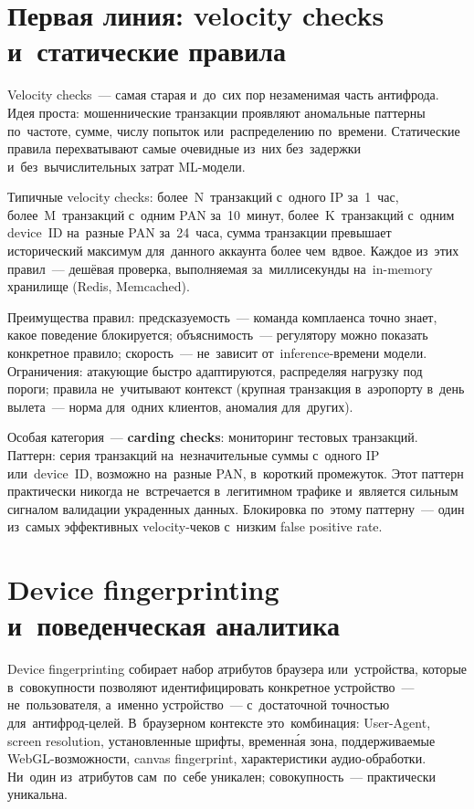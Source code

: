 \section{Первая линия: velocity checks и~статические правила}
\label{sec:fraud-rules}

Velocity checks~--- самая старая и~до~сих пор незаменимая часть
антифрода. Идея проста: мошеннические транзакции проявляют аномальные
паттерны по~частоте, сумме, числу попыток или~распределению по~времени.
Статические правила перехватывают самые очевидные из~них без~задержки
и~без~вычислительных затрат ML-модели.

Типичные velocity checks: более~N~транзакций с~одного IP за~1~час,
более~M~транзакций с~одним PAN за~10~минут, более~K~транзакций
с~одним device~ID на~разные PAN за~24~часа, сумма транзакции превышает
исторический максимум для~данного аккаунта более чем~вдвое. Каждое
из~этих правил~--- дешёвая проверка, выполняемая за~миллисекунды
на~in-memory хранилище (Redis, Memcached).

Преимущества правил: предсказуемость~--- команда комплаенса точно знает,
какое поведение блокируется; объяснимость~--- регулятору можно показать
конкретное правило; скорость~--- не~зависит от~inference-времени модели.
Ограничения: атакующие быстро адаптируются, распределяя нагрузку под
пороги; правила не~учитывают контекст (крупная транзакция в~аэропорту
в~день вылета~--- норма для~одних клиентов, аномалия для~других).

Особая категория~--- \textbf{carding checks}: мониторинг тестовых
транзакций. Паттерн: серия транзакций на~незначительные суммы с~одного
IP или~device~ID, возможно на~разные PAN, в~короткий промежуток. Этот
паттерн практически никогда не~встречается в~легитимном трафике и~является
сильным сигналом валидации украденных данных. Блокировка по~этому
паттерну~--- один из~самых эффективных velocity-чеков с~низким false
positive rate.


\section{Device fingerprinting и~поведенческая аналитика}
\label{sec:fraud-fingerprint}

Device fingerprinting собирает набор атрибутов браузера или~устройства,
которые в~совокупности позволяют идентифицировать конкретное устройство~---
не~пользователя, а~именно устройство~--- с~достаточной точностью для~антифрод-целей.
В~браузерном контексте это~комбинация: User-Agent, screen resolution,
установленные шрифты, временна́я зона, поддерживаемые WebGL-возможности,
canvas fingerprint, характеристики аудио-обработки. Ни~один из~атрибутов
сам~по~себе уникален; совокупность~--- практически уникальна.

